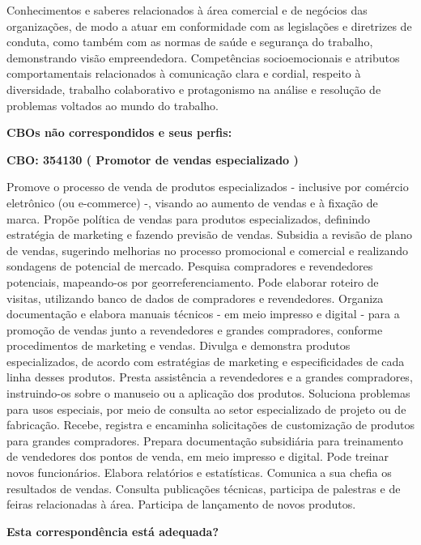 \documentclass[
]{article}
\begin{document}
Conhecimentos e saberes relacionados à área comercial e de negócios das
organizações, de modo a atuar em conformidade com as legislações e
diretrizes de conduta, como também com as normas de saúde e segurança do
trabalho, demonstrando visão empreendedora. Competências socioemocionais
e atributos comportamentais relacionados à comunicação clara e cordial,
respeito à diversidade, trabalho colaborativo e protagonismo na análise
e resolução de problemas voltados ao mundo do trabalho.

\textbf{CBOs não correspondidos e seus perfis:}

\textbf{CBO: 354130  ( Promotor de vendas especializado )}

Promove o processo de venda de produtos especializados - inclusive por
comércio eletrônico (ou e-commerce) -, visando ao aumento de vendas e à
fixação de marca. Propõe política de vendas para produtos
especializados, definindo estratégia de marketing e fazendo previsão de
vendas. Subsidia a revisão de plano de vendas, sugerindo melhorias no
processo promocional e comercial e realizando sondagens de potencial de
mercado. Pesquisa compradores e revendedores potenciais, mapeando-os por
georreferenciamento. Pode elaborar roteiro de visitas, utilizando banco
de dados de compradores e revendedores. Organiza documentação e elabora
manuais técnicos - em meio impresso e digital - para a promoção de
vendas junto a revendedores e grandes compradores, conforme
procedimentos de marketing e vendas. Divulga e demonstra produtos
especializados, de acordo com estratégias de marketing e especificidades
de cada linha desses produtos. Presta assistência a revendedores e a
grandes compradores, instruindo-os sobre o manuseio ou a aplicação dos
produtos. Soluciona problemas para usos especiais, por meio de consulta
ao setor especializado de projeto ou de fabricação. Recebe, registra e
encaminha solicitações de customização de produtos para grandes
compradores. Prepara documentação subsidiária para treinamento de
vendedores dos pontos de venda, em meio impresso e digital. Pode treinar
novos funcionários. Elabora relatórios e estatísticas. Comunica a sua
chefia os resultados de vendas. Consulta publicações técnicas, participa
de palestras e de feiras relacionadas à área. Participa de lançamento de
novos produtos.

\begin{Form}
\textbf{Esta correspondência está adequada?} \\ 
\end{Form}
\end{document}
